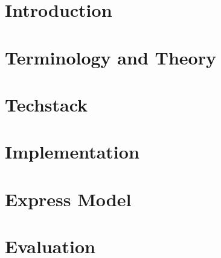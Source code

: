 \documentclass[thesis]{plai}
\begin{document}
\vspace{1,5cm}







\newpage
\tableofcontents
\newpage

\setcounter{page}{1}
\pagestyle{fancy}
\fancyhf{}
\fancyhead[R]{\thepage}
\renewcommand{\headrulewidth}{0pt}
\raggedbottom
\chapter{Introduction}
\label{chapter:introduction}


\chapter{Terminology and Theory}
\label{chapter:background}


\chapter{Techstack}
\label{chapter:techstack}


\chapter{Implementation}
\label{chapter:implementation}



\chapter{Express Model}
\label{chapter:express}




\chapter{Evaluation}
\label{chapter:evaluation}

\end{document}
